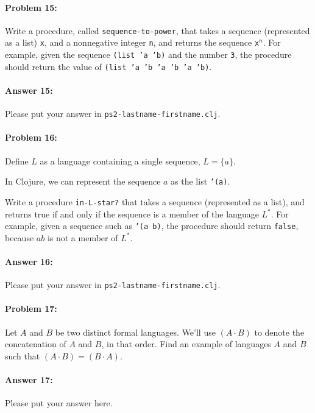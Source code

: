 \documentclass[10pt]{article}
\newcommand{\PSnum}{2}
\begin{document}
\paragraph{Problem 15:}
Write a procedure, called \texttt{sequence-to-power}, that takes a
sequence (represented as a list) \texttt{x}, and a nonnegative integer
\texttt{n}, and returns the sequence \texttt{x}$^n$. For
example, given the sequence \texttt{(list 'a 'b)} and the number
\texttt{3}, the procedure should return the value of
\texttt{(list 'a 'b 'a 'b 'a 'b)}.

\paragraph{Answer 15:} Please put your answer in
\texttt{ps\PSnum-lastname-firstname.clj}.

\noindent\hrulefill %

\paragraph{Problem 16:}
Define $L$ as a language containing a single sequence,
$L=\{a\}$.

In Clojure, we can represent the sequence $a$ as the list \texttt{'(a)}.

Write a procedure \texttt{in-L-star?} that takes a sequence
(represented as a list), and returns true if and only if the sequence is a member
of the language $L^*$.
For example, given a sequence such as \texttt{'(a b)}, the procedure should return
\texttt{false}, because $ab$ is not a member of $L^*$.

\paragraph{Answer 16:} Please put your answer in
\texttt{ps\PSnum-lastname-firstname.clj}.

\noindent\hrulefill %

\paragraph{Problem 17:}
Let $A$ and $B$ be two distinct formal languages. We'll use
$(A\cdot B)$ to denote the concatenation of $A$ and $B$, in
that order. Find an example of languages $A$ and $B$ such that
$(A\cdot B)=(B\cdot A)$.

\paragraph{Answer 17:} Please put your answer here. 
\end{document}
